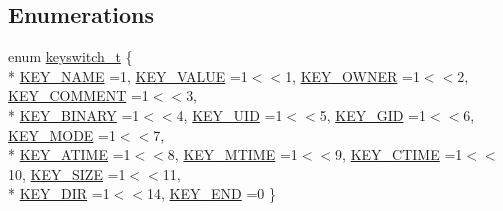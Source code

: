 \subsection*{Enumerations}
\begin{DoxyCompactItemize}
\item 
enum \hyperlink{group__key_ga91fb3178848bd682000958089abbaf40}{keyswitch\-\_\-t} \{ \\*
\hyperlink{group__key_gga91fb3178848bd682000958089abbaf40ad6127fc38f96410bf7c8f6e93b0397da}{K\-E\-Y\-\_\-\-N\-A\-M\-E} =1, 
\hyperlink{group__key_gga91fb3178848bd682000958089abbaf40ac66e4a49d09212b79f5754ca6db5bd2e}{K\-E\-Y\-\_\-\-V\-A\-L\-U\-E} =1$<$$<$1, 
\hyperlink{group__key_gga91fb3178848bd682000958089abbaf40a77ca60362fa8daca8d5347db4385068b}{K\-E\-Y\-\_\-\-O\-W\-N\-E\-R} =1$<$$<$2, 
\hyperlink{group__key_gga91fb3178848bd682000958089abbaf40ac29427bb47cc31689d02912e36161ee3}{K\-E\-Y\-\_\-\-C\-O\-M\-M\-E\-N\-T} =1$<$$<$3, 
\\*
\hyperlink{group__key_gga91fb3178848bd682000958089abbaf40a1ca18d4e094ae7487d35ecedda2235ff}{K\-E\-Y\-\_\-\-B\-I\-N\-A\-R\-Y} =1$<$$<$4, 
\hyperlink{group__key_gga91fb3178848bd682000958089abbaf40a28f01a87d65f065172f734c9c9446c0e}{K\-E\-Y\-\_\-\-U\-I\-D} =1$<$$<$5, 
\hyperlink{group__key_gga91fb3178848bd682000958089abbaf40ac0628bbaba7c837ca73323681393d15f}{K\-E\-Y\-\_\-\-G\-I\-D} =1$<$$<$6, 
\hyperlink{group__key_gga91fb3178848bd682000958089abbaf40a1b0a91ff3a855d6993930ebf0abaa518}{K\-E\-Y\-\_\-\-M\-O\-D\-E} =1$<$$<$7, 
\\*
\hyperlink{group__key_gga91fb3178848bd682000958089abbaf40af303f9ebb4983d7500ba8e06ef3ec178}{K\-E\-Y\-\_\-\-A\-T\-I\-M\-E} =1$<$$<$8, 
\hyperlink{group__key_gga91fb3178848bd682000958089abbaf40abfbab4bf55be6c53a7ffb2e43a82b355}{K\-E\-Y\-\_\-\-M\-T\-I\-M\-E} =1$<$$<$9, 
\hyperlink{group__key_gga91fb3178848bd682000958089abbaf40afbad53ecfc1512b1b49ca04b57a628b4}{K\-E\-Y\-\_\-\-C\-T\-I\-M\-E} =1$<$$<$10, 
\hyperlink{group__key_gga91fb3178848bd682000958089abbaf40a6d531b5c41445d19d0452eebdccbfa01}{K\-E\-Y\-\_\-\-S\-I\-Z\-E} =1$<$$<$11, 
\\*
\hyperlink{group__key_gga91fb3178848bd682000958089abbaf40a9e43e47c8a21478538e2d20e049981d5}{K\-E\-Y\-\_\-\-D\-I\-R} =1$<$$<$14, 
\hyperlink{group__key_gga91fb3178848bd682000958089abbaf40aa8adb6fcb92dec58fb19410eacfdd403}{K\-E\-Y\-\_\-\-E\-N\-D} =0
 \}
\end{DoxyCompactItemize}
